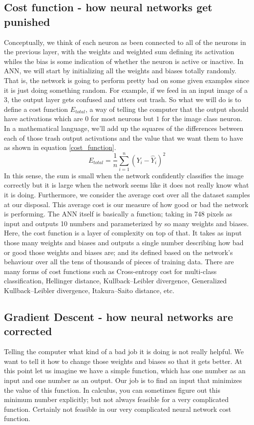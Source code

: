 \documentclass[master]{thesis-uestc}
\begin{document}
\subsection{Cost function - how neural networks get punished}
Conceptually, we think of each neuron as been connected to all of the neurons in the previous layer, with the weights and weighted sum defining its activation whiles the bias is some indication of whether the neuron is active or inactive. In ANN, we will start by initializing all the weights and biases totally randomly. That is, the network is going to perform pretty bad on some given examples since it is just doing something random. For example, if we feed in an input image of a $3$, the output layer gets confused and utters out trash. So what we will do is to define a cost function $E_{total}$, a way of telling the computer that the output should have activations which are $0$ for most neurons but $1$ for the image class neuron. In a mathematical language, we’ll add up the squares of the differences between each of those trash output activations and the value that we want them to have as shown in equation \ref{cost_function}.
\begin{equation}
    E_{total} = \frac{1}{n}\sum_{i=1}^{n} (Y_i - \hat{Y}_i)^2
    \label{cost_function}
\end{equation}
In this sense, the sum is small when the network confidently classifies the image correctly but it is large when the network seems like it does not really know what it is doing. Furthermore, we consider the average cost over all the dataset samples at our disposal. This average cost is our measure of how good or bad the network is performing. The ANN itself is basically a function; taking in 748 pixels as input and outputs 10 numbers and parameterized by so many weights and biases. Here, the cost function is a layer of complexity on top of that. It takes as input those many weights and biases and outputs a single number describing how bad or good those weights and biases are; and its defined based on the network's behaviour over all the tens of thousands of pieces of training data. There are many forms of cost functions such as Cross-entropy cost\cite{deBoer2005} for multi-class classification, Hellinger distance\cite{Nikulin2018}, Kullback–Leibler divergence\cite{kullback1951}, Generalized Kullback–Leibler divergence\cite{4655451}, Itakura–Saito distance\cite{NOZAKI201763}, etc.

\subsection{Gradient Descent - how neural networks are corrected}
Telling the computer what kind of a bad job it is doing is not really helpful. We want to tell it how to change those weights and biases so that it gets better. At this point let us imagine we have a simple function, which has one number as an input and one number as an output. Our job is to find an input that minimizes the value of this function. In calculus, you can sometimes figure out this minimum number explicitly; but not always feasible for a very complicated function. Certainly not feasible in our very complicated neural network cost function. 
\end{document}
